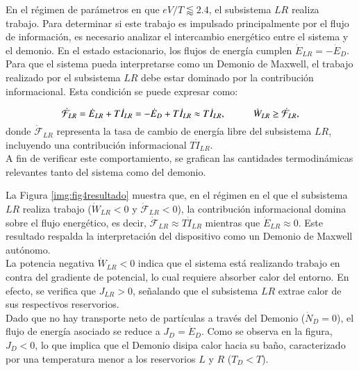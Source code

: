 En el régimen de parámetros en que \( eV/T \lessapprox 2.4 \), el subsistema \( LR \) realiza trabajo. Para determinar si este trabajo es impulsado principalmente por el flujo de información, es necesario analizar el intercambio energético entre el sistema y el demonio. En el estado estacionario, los flujos de energía cumplen $\dot{E}_{LR}= -\dot{E}_{D}$. Para que el sistema pueda interpretarse como un Demonio de Maxwell, el trabajo realizado por el subsistema \( LR \) debe estar dominado por la contribución informacional. Esta condición se puede expresar como:

\[
\dot{\mathcal{F}}_{LR} = \dot{E}_{LR} + T\dot{I}_{LR} = -\dot{E}_{D} + T\dot{I}_{LR} \approx T\dot{I}_{LR}, \hspace{10mm} \dot{W}_{LR} \geq \dot{\mathcal{F}}_{LR},
\]
donde \( \dot{\mathcal{F}}_{LR} \) representa la tasa de cambio de energía libre del subsistema \( LR \), incluyendo una contribución informacional \( T\dot{I}_{LR} \).
\\

A fin de verificar este comportamiento, se grafican las cantidades termodinámicas relevantes tanto del sistema como del demonio.



La Figura \ref{img:fig4resultado} muestra que, en el régimen en el que el subsistema $LR$ realiza trabajo ($\dot{W}_{LR} < 0$ y $\dot{\mathcal{F}}_{LR} < 0$), la contribución informacional domina sobre el flujo energético, es decir, $\dot{\mathcal{F}}_{LR} \approx T \dot{I}_{LR}$ mientras que $\dot{E}_{LR} \approx 0$. Este resultado respalda la interpretación del dispositivo como un Demonio de Maxwell autónomo.
\\

La potencia negativa $\dot{W}_{LR} < 0$ indica que el sistema está realizando trabajo en contra del gradiente de potencial, lo cual requiere absorber calor del entorno. En efecto, se verifica que $J_{LR} > 0$, señalando que el subsistema $LR$ extrae calor de sus respectivos reservorios.
\\

Dado que no hay transporte neto de partículas a través del Demonio ($\dot{N}_{D} = 0$), el flujo de energía asociado se reduce a $J_{D} = \dot{E}_{D}$. Como se observa en la figura, $J_{D} < 0$, lo que implica que el Demonio disipa calor hacia su baño, caracterizado por una temperatura menor a los reservorios $L$ y $R$ ($T_D < T$). 
\\

